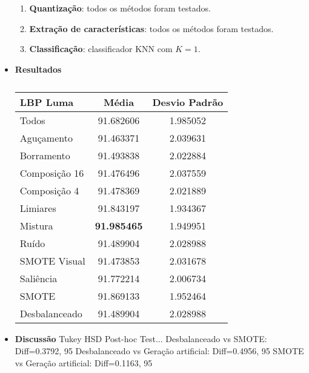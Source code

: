 \begin{itemize}
\begin{enumerate}
\item \textbf{Quantização}: todos os métodos foram testados.
\item \textbf{Extração de características}: todos os métodos foram testados.
\item \textbf{Classificação}: classificador KNN com $K=1$.
\end{enumerate}

\item[] \textbf{Resultados}

\begin{table}[!htbp]
\centering
\caption{}
\label{tab:resultados:3.3}
\begin{tabular}{|l|c|c|}
\hline
\textbf{LBP Luma} & \textbf{Média}     & \textbf{Desvio Padrão} \\ \hline
   Todos        &  91.682606 &  1.985052  \\ \hline
  Aguçamento    &  91.463371 &  2.039631  \\ \hline
  Borramento    &  91.493838 &  2.022884  \\ \hline
  Composição 16 &  91.476496 &  2.037559  \\ \hline
  Composição 4  &  91.478369 &  2.021889  \\ \hline
  Limiares      &  91.843197 &  1.934367  \\ \hline
  Mistura       &  \textbf{91.985465} &  1.949951  \\ \hline
  Ruído         &  91.489904 &  2.028988  \\ \hline
  SMOTE Visual  &  91.473853 &  2.031678  \\ \hline
  Saliência     &  91.772214 &  2.006734  \\ \hline
 SMOTE          &  91.869133 &  1.952464  \\ \hline
Desbalanceado   &  91.489904 &  2.028988  \\ \hline
\end{tabular}
\end{table}

\item[] \textbf{Discussão}
Tukey HSD Post-hoc Test...
Desbalanceado vs SMOTE: Diff=0.3792, 95%
Desbalanceado vs Geração artificial: Diff=0.4956, 95%
SMOTE vs Geração artificial: Diff=0.1163, 95%


\end{itemize}


